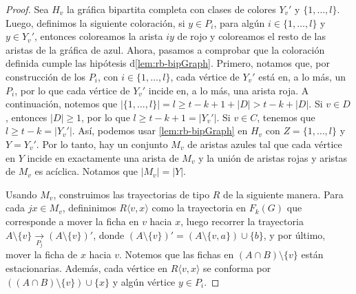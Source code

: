 \begin{proof}
    Sea $H_v$ la gr\'afica bipartita completa con clases de colores $Y_v '$ y
    $\{1,\dots, l\}$. Luego, definimos la siguiente coloraci\'on, si $y \in
    P_i$, para alg\'un $i \in \{1, \dots, l\}$ y $y \in Y_v '$, entonces
    coloreamos la arista $iy$ de rojo y coloreamos el resto de las aristas de la
    gr\'afica de azul. Ahora, pasamos a comprobar que la coloraci\'on definida
    cumple las hip\'otesis d\cref{lem:rb-bipGraph}. Primero, notamos que, por
    construcci\'on de los $P_i$, con $i \in \{1, \dots, l\}$, cada v\'ertice de
    $Y_v '$ est\'a en, a lo m\'as, un $P_i$, por lo que cada v\'ertice de $Y_v
    '$ incide en, a lo m\'as, una arista roja. A continuaci\'on, notemos que
    $|\{1, \dots, l\}| = l  \geq t-k+ 1+ |D| > t-k + |D|$. Si $v \in D$,
    entonces $|D| \geq 1$, por lo que $l \geq t- k+1 = |Y_v '|$. Si $v \in C$,
    tenemos que $l \geq t-k = |Y_v '|$. As\'i, podemos usar
    \cref{lem:rb-bipGraph} en $H_v$ con $Z= \{1, \dots, l\}$ y $Y = Y_v '$. Por
    lo tanto, hay un conjunto $M_v$ de aristas azules tal que cada v\'ertice en
    $Y$ incide en exactamente una arista de $M_v$ y la uni\'on de aristas rojas
    y aristas de $M_v$ es ac\'iclica. Notamos que $|M_v|=|Y|$.

    Usando $M_v$, construimos las trayectorias de tipo $R$ de la siguiente
    manera. Para cada $jx \in M_v$, defininimos $R\langle v, x \rangle$ como la
    trayectoria en $F_k(G)$ que corresponde a mover la ficha en $v$ hacia $x$,
    luego recorrer la trayectoria $A\setminus \{v\} \xrightarrow[P_j]{}
    (A\setminus \{v\})'$, donde $(A\setminus \{v\})' = (A\setminus \{v,a\})\cup
    \{b\}$, y por \'ultimo, mover la ficha de $x$ hacia $v$. Notemos que las
    fichas en $(A\cap B)\setminus \{v\}$ est\'an estacionarias. Adem\'as, cada
    v\'ertice en $R\langle v,x \rangle$ se conforma por $((A\cap B)\setminus
    \{v\}) \cup \{x\}$ y alg\'un v\'ertice $y \in P_i$.


\end{proof}
